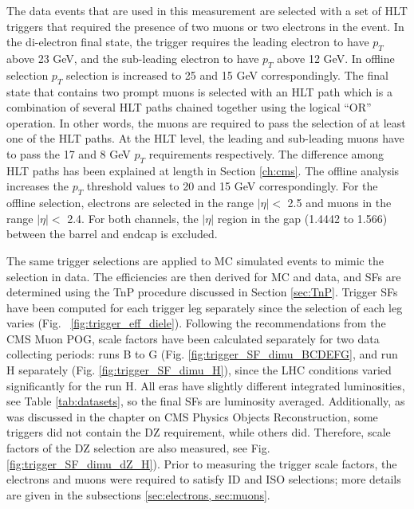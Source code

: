 The data events that are used in this measurement are selected with a set of HLT triggers that required the presence of two muons or two electrons in the event. In the di-electron final state, the trigger requires the leading electron to have $p_T$ above 23 GeV, and the sub-leading electron to have $p_T$ above 12 GeV. In offline selection $p_T$ selection is increased to 25 and 15 GeV correspondingly. %
The final state that contains two prompt muons is selected with an HLT path which is a combination of several HLT paths chained together using the logical ``OR'' operation. In other words, the muons are required to pass the selection of at least one of the HLT paths. At the HLT level, the leading and sub-leading muons have to pass the 17 and 8 GeV $p_T$ requirements respectively. The difference among HLT paths has been explained at length in Section \ref{ch:cms}. The offline analysis increases the $p_T$ threshold values to 20 and 15 GeV correspondingly. For the offline selection, electrons are selected in the range $|\eta| < $ 2.5 and muons in the range $|\eta| < $ 2.4. For both channels, the $|\eta|$ region in the gap (1.4442 to 1.566) between the barrel and endcap is excluded.

The same trigger selections are applied to MC simulated events to mimic the selection in data. The efficiencies are then derived for MC and data, and SFs are determined using the TnP procedure discussed in Section \ref{sec:TnP}. Trigger SFs have been computed for each trigger leg separately since the selection of each leg varies (Fig. ~\ref{fig:trigger_eff_diele}). Following the recommendations from the CMS Muon POG, scale factors have been calculated separately for two data collecting periods: runs B to G (Fig. \ref{fig:trigger_SF_dimu_BCDEFG}, and run H separately (Fig. \ref{fig:trigger_SF_dimu_H}), since the LHC conditions varied significantly for the run H. All eras have slightly different integrated luminosities, see Table \ref{tab:datasets}, so the final SFs are luminosity averaged. Additionally, as was discussed in the chapter on CMS Physics Objects Reconstruction, some triggers did not contain the DZ requirement, while others did. Therefore, scale factors of the DZ selection are also measured, see Fig. \ref{fig:trigger_SF_dimu_dZ_H}). Prior to measuring the trigger scale factors, the electrons and muons were required to satisfy ID and ISO selections; more details are given in the subsections \ref{sec:electrons, sec:muons}. 

